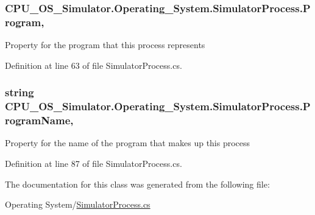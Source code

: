 \subsubsection[{Program}]{ C\+P\+U\+\_\+\+O\+S\+\_\+\+Simulator.\+Operating\+\_\+\+System.\+Simulator\+Process.\+Program\hspace{0.3cm}{\ttfamily [get]}, {\ttfamily [set]}}\label{class_c_p_u___o_s___simulator_1_1_operating___system_1_1_simulator_process_a594fe15fec1c942ccfbcfa9c345624ee}


Property for the program that this process represents 



Definition at line 63 of file Simulator\+Process.\+cs.

\hypertarget{class_c_p_u___o_s___simulator_1_1_operating___system_1_1_simulator_process_adbe9e17fd9415e4417646309fefbf44b}{}
\subsubsection[{Program\+Name}]{\setlength{\rightskip}{0pt plus 5cm}string C\+P\+U\+\_\+\+O\+S\+\_\+\+Simulator.\+Operating\+\_\+\+System.\+Simulator\+Process.\+Program\+Name\hspace{0.3cm}{\ttfamily [get]}, {\ttfamily [set]}}\label{class_c_p_u___o_s___simulator_1_1_operating___system_1_1_simulator_process_adbe9e17fd9415e4417646309fefbf44b}


Property for the name of the program that makes up this process 



Definition at line 87 of file Simulator\+Process.\+cs.



The documentation for this class was generated from the following file\+:\begin{DoxyCompactItemize}
\item 
Operating System/\hyperlink{_simulator_process_8cs}{Simulator\+Process.\+cs}\end{DoxyCompactItemize}
